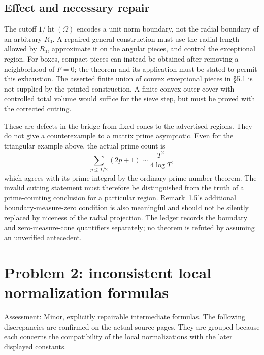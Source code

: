 \documentclass[10pt]{article}
\begin{document}
\subsection*{Effect and necessary repair}
The cutoff \(1/\operatorname{ht}(\Omega)\) encodes a unit norm boundary, not the radial boundary of an arbitrary \(R_0\). A repaired general construction must use the radial length allowed by \(R_0\), approximate it on the angular pieces, and control the exceptional region. For boxes, compact pieces can instead be obtained after removing a neighborhood of \(F=0\); the theorem and its application must be stated to permit this exhaustion. The asserted finite union of convex exceptional pieces in §5.1 is not supplied by the printed construction. A finite convex outer cover with controlled total volume would suffice for the sieve step, but must be proved with the corrected cutting.\par
These are defects in the bridge from fixed cones to the advertised regions. They do not give a counterexample to a matrix prime asymptotic. Even for the triangular example above, the actual prime count is \[\sum_{p\le T/2}(2p+1)\sim\frac{T^2}{4\log T},\] which agrees with its prime integral by the ordinary prime number theorem. The invalid cutting statement must therefore be distinguished from the truth of a prime-counting conclusion for a particular region. Remark 1.5’s additional boundary-measure-zero condition is also meaningful and should not be silently replaced by niceness of the radial projection. The ledger records the boundary and zero-measure-cone quantifiers separately; no theorem is refuted by assuming an unverified antecedent.\par
\section*{Problem 2: inconsistent local normalization formulas}
Assessment: Minor, explicitly repairable intermediate formulas. The following discrepancies are confirmed on the actual source pages. They are grouped because each concerns the compatibility of the local normalizations with the later displayed constants.\par
\end{document}
